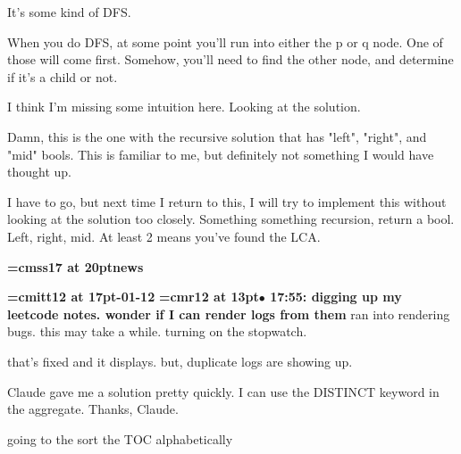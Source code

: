 It's some kind of DFS.
\par

When you do DFS, at some point you'll run into either the p or q node. One of those will come first. Somehow, you'll need to find the other node, and determine if it's a child or not.
\par

I think I'm missing some intuition here. Looking at the solution.
\par

Damn, this is the one with the recursive solution that has "left", "right", and "mid" bools. This is familiar to me, but definitely not something I would have thought up.
\par

I have to go, but next time I return to this, I will try to implement this without looking at the solution too closely. Something something recursion, return a bool. Left, right, mid. At least 2 means you've found the LCA.
\par

{\medskip\noindent\bf\font\titlefont=cmss17 at 20pt\titlefont news}\medskip

{\medskip\noindent\bf\font\titlefont=cmitt12 at 17pt-01-12}\medskip
{\smallskip\noindent\bf\font\titlefont=cmr12 at 13pt\titlefont $\bullet$ 17:55: digging up my leetcode notes. wonder if I can render logs from them}\smallskip
ran into rendering bugs. this may take a while. turning on the stopwatch.
\par

that's fixed and it displays. but, duplicate logs are showing up.
\par

Claude gave me a solution pretty quickly. I can use the DISTINCT keyword in the aggregate. Thanks, Claude.
\par

going to the sort the TOC alphabetically
\par

\bye
